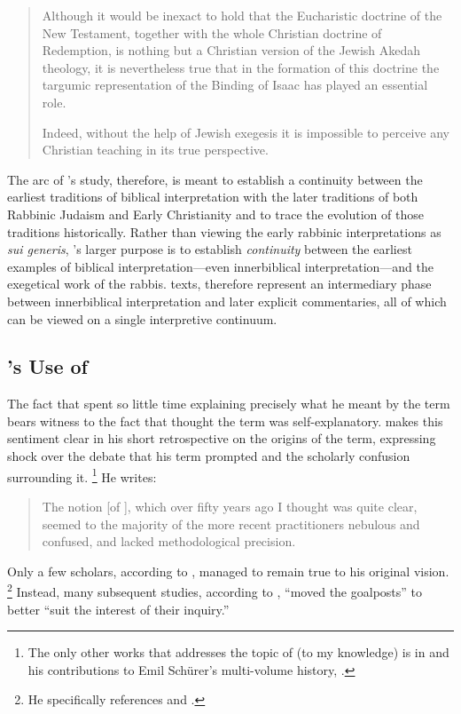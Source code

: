 \begin{quote}
    Although it would be inexact to hold that the Eucharistic doctrine of the New Testament, together with the whole Christian doctrine of Redemption, is nothing but a Christian version of the Jewish Akedah theology, it is nevertheless true that in the formation of this doctrine the targumic representation of the Binding of Isaac has played an essential role. 
    
    Indeed, without the help of Jewish exegesis it is impossible to perceive any Christian teaching in its true perspective.%
    \autocite[227]{vermes1961}
\end{quote} 
\noindent
%
The arc of \vermes's study, therefore, is meant to establish a continuity between the earliest traditions of biblical interpretation with the later traditions of both Rabbinic Judaism and Early Christianity and to trace the evolution of those traditions historically. Rather than viewing the early rabbinic interpretations as \emph{sui generis}, \vermes's larger purpose is to establish \emph{continuity} between the earliest examples of biblical interpretation---even innerbiblical interpretation---and the exegetical work of the rabbis. \RwB texts, therefore represent an intermediary phase between innerbiblical interpretation and later explicit commentaries, all of which can be viewed on a single interpretive continuum.

\subsection{\vermes's Use of \RWB} 

The fact that \vermes spent so little time explaining precisely what he meant by the term \rwb bears witness to the fact that \vermes thought the term was self-explanatory. \vermes makes this sentiment clear in his short retrospective on the origins of the term, expressing shock over the debate that his term prompted and the scholarly confusion surrounding it.%
    \footnote{The only other works that \vermes addresses the topic of \rwb (to my knowledge) is in \cite{vermes_eretz-israel1989} and his contributions to Emil Schürer's multi-volume history, \cite{schurer1986}.}
%
He writes: 

\begin{quote}
    The notion [of \rwb], which over fifty years ago I thought was quite clear, seemed to the majority of the more recent practitioners nebulous and confused, and lacked methodological precision.%
    \autocite[3]{vermes_zsengeller2014}
\end{quote} 
\noindent
%
Only a few scholars, according to \vermes, managed to remain true to his original vision.%
    \footnote{He specifically references
    \cite{alexander_carson-williamson1988} and 
    \cite{bernstein_textus2005}.}
%
Instead, many subsequent studies, according to \vermes, ``moved the goalposts'' to better ``suit the interest of their inquiry.''%
    \autocite[4]{vermes_zsengeller2014}

